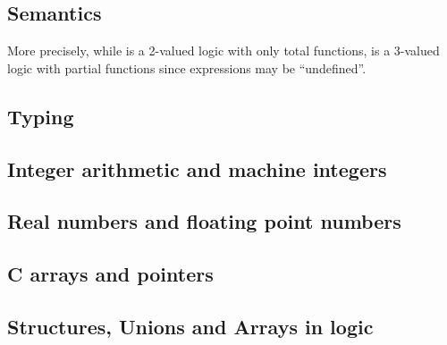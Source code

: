 
\subsection{Semantics}
\label{sec:twovaluedlogic}


More precisely, while \acsl is a 2-valued logic with only total functions,
\eacsl is a 3-valued logic with partial functions since expressions may be
``undefined''.



\subsection{Typing}
\nodiff


\subsection{Integer arithmetic and machine integers}
\nodiff


\subsection{Real numbers and floating point numbers}
\nodiff


\subsection{C arrays and pointers}
\nodiff


\subsection{Structures, Unions and Arrays in logic}


